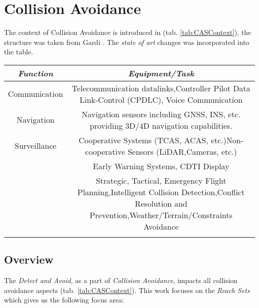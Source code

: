 \cleardoublepage
\chapter{Collision Avoidance}\label{ch:CollisionAvoidance}
\noindent The context of Collision Avoidance is introduced in (tab. \ref{tab:CASContext}), the structure was taken from Gardi \cite{gardi2015automated}. The \emph{state of art} changes was incorporated into the table.

\begin{tabularx}{\textwidth}{S{0.20}||S{0.55}} 
    \centering \emph{Function} &  \emph{Equipment/Task}\\ \hline\hline
    \centering Communication & Telecommunication datalinks,\newline Controller Pilot Data Link-Control (CPDLC), \newline Voice Communication\\\hline
    \centering Navigation & Navigation sensors including GNSS, INS, etc. providing 3D/4D navigation capabilities.\\\hline
    \centering Surveillance & Cooperative Systems (TCAS, ACAS, etc.)\newline Non-cooperative Sensors (LiDAR,Cameras, etc.)\\\hline
     & Early Warning Systems, \newline CDTI Display\\\hline
    & Strategic, Tactical, Emergency Flight Planning,\newline Intelligent Collision Detection,\newline Conflict Resolution and Prevention,\newline Weather/Terrain/Constraints Avoidance\\
    \caption{Collision avoidance systems context overview \cite{gardi2015automated}.}
    \label{tab:CASContext}
\end{tabularx}

\newpage
\section{Overview}\label{s:collisionAvoidanceOverview}
\noindent The \emph{Detect and Avoid}, as a part of \emph{Collision Avoidance}, impacts all collision avoidance aspects (tab. \ref{tab:CASContext}). This work focuses on the \emph{Reach Sets} which gives us the following focus area:

